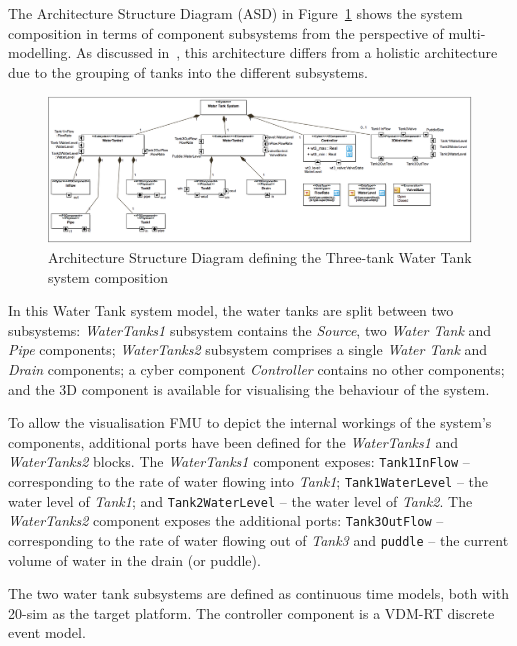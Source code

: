 The Architecture Structure Diagram (ASD) in Figure~\ref{fig:threetankasd} shows the system composition in terms of component subsystems from the perspective of multi-modelling. As discussed in~\cite{INTOCPSD3.4}, this architecture differs from a holistic architecture due to the grouping of tanks into the different subsystems. 

\begin{figure}[htbp]
\begin{center}
\includegraphics[width=1\textwidth]{threetank/ttwt_asd_vis.png}
\caption{Architecture Structure Diagram defining the Three-tank Water Tank system composition}
\label{fig:threetankasd}
\end{center}
\end{figure}

In this Water Tank system model, the water tanks are split between two subsystems: \emph{WaterTanks1} subsystem contains the \emph{Source}, two \emph{Water Tank} and  \emph{Pipe} components; \emph{WaterTanks2} subsystem comprises a single \emph{Water Tank} and \emph{Drain} components; a cyber component \emph{Controller} contains no other components; and the 3D component is available for visualising the behaviour of the system. 

To allow the visualisation FMU to depict the internal workings of the system's components, additional ports have been defined for the \emph{WaterTanks1} and  \emph{WaterTanks2} blocks. The \emph{WaterTanks1} component exposes: \texttt{Tank1InFlow} -- corresponding to the rate of water flowing into \emph{Tank1}; \texttt{Tank1WaterLevel} -- the water level of \emph{Tank1}; and \texttt{Tank2WaterLevel} -- the water level of \emph{Tank2}. The \emph{WaterTanks2} component exposes the additional ports: \texttt{Tank3OutFlow} -- corresponding to the rate of water flowing out of \emph{Tank3} and \texttt{puddle} -- the current volume of water in the drain (or puddle).

The two water tank subsystems are defined as continuous time models, both with 20-sim as the target platform. The controller component is a VDM-RT discrete event model. 

